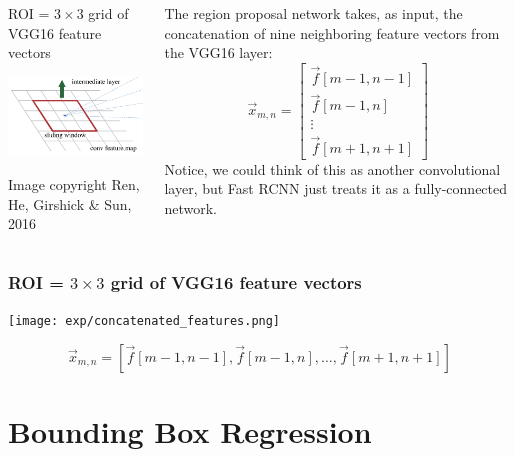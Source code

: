 \documentclass{beamer}
\begin{document}
\begin{frame}
  \begin{columns}
    \column{2.25in}
    \begin{block}{ROI = $3\times 3$ grid of VGG16 feature vectors}
      \centerline{\includegraphics[width=2.15in]{figs/ren2016fig2a.png}}
      \begin{tiny}Image copyright Ren, He, Girshick \& Sun, 2016\end{tiny}
    \end{block}
    \column{2.25in}
    \begin{block}{}
      The region proposal network takes, as input, the concatenation
      of nine neighboring feature vectors from the VGG16 layer:
      \[
      \vec{x}_{m,n}=\left[\begin{array}{c}
          \vec{f}[m-1,n-1]\\
          \vec{f}[m-1,n]\\
          \vdots\\
          \vec{f}[m+1,n+1]
        \end{array}\right]
      \]
      Notice, we could think of this as another convolutional layer,
      but Fast RCNN just treats it as a fully-connected network.
    \end{block}
  \end{columns}
\end{frame}

\begin{frame}
  \frametitle{ROI = $3\times 3$ grid of VGG16 feature vectors}
  \centerline{\texttt{[image: exp/concatenated\_features.png]}}
      \[\vec{x}_{m,n}=[\vec{f}[m-1,n-1],\vec{f}[m-1,n],\ldots,\vec{f}[m+1,n+1]]\]
\end{frame}


\section[Regression]{Bounding Box Regression}
\setcounter{subsection}{1}
\end{document}
